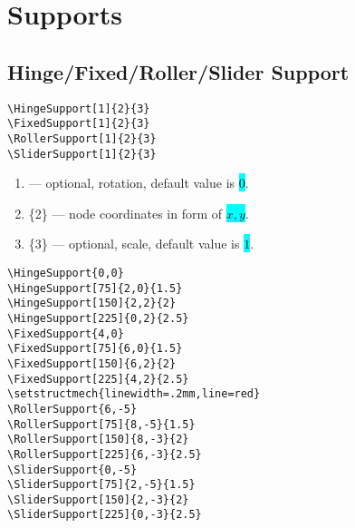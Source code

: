 \documentclass[10pt,a4paper]{article}
\newcommand*{\Highlight}[1]{\colorbox{cyan}{\color{red}\texttt{#1}}}
\begin{document}
\section{Supports}
\subsection{Hinge/Fixed/Roller/Slider Support}
\begin{Verbatim}[frame=single,label=Syntax]
\HingeSupport[1]{2}{3}
\FixedSupport[1]{2}{3}
\RollerSupport[1]{2}{3}
\SliderSupport[1]{2}{3}
\end{Verbatim}
\begin{enumerate}
\item[][1] --- optional, rotation, default value is \Highlight{$0$}.
\item[]\{2\} --- node coordinates in form of \Highlight{$x,y$}.
\item[]\{3\} --- optional, scale, default value is \Highlight{$1$}.
\end{enumerate}
\begin{Verbatim}[frame=single,label=Example]
\HingeSupport{0,0}
\HingeSupport[75]{2,0}{1.5}
\HingeSupport[150]{2,2}{2}
\HingeSupport[225]{0,2}{2.5}
\FixedSupport{4,0}
\FixedSupport[75]{6,0}{1.5}
\FixedSupport[150]{6,2}{2}
\FixedSupport[225]{4,2}{2.5}
\setstructmech{linewidth=.2mm,line=red}
\RollerSupport{6,-5}
\RollerSupport[75]{8,-5}{1.5}
\RollerSupport[150]{8,-3}{2}
\RollerSupport[225]{6,-3}{2.5}
\SliderSupport{0,-5}
\SliderSupport[75]{2,-5}{1.5}
\SliderSupport[150]{2,-3}{2}
\SliderSupport[225]{0,-3}{2.5}
\end{Verbatim}
\end{document}
